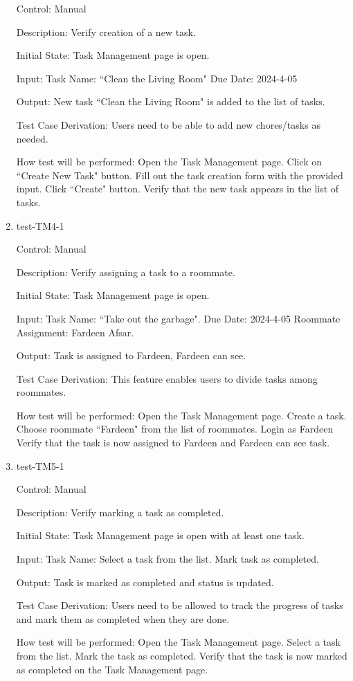 \documentclass[12pt, titlepage]{article}
\begin{document}
\begin{enumerate}
Control: Manual

Description: Verify creation of a new task.
					
Initial State: Task Management page is open.
					
Input: Task Name: ``Clean the Living Room"
Due Date: 2024-4-05
					
Output: New task ``Clean the Living Room" is added to the list of tasks.

Test Case Derivation: Users need to be able to add new chores/tasks as needed.

How test will be performed: 
Open the Task Management page.
Click on ``Create New Task" button.
Fill out the task creation form with the provided input.
Click ``Create" button.
Verify that the new task appears in the list of tasks.


\item{test-TM4-1\\}

Control: Manual

Description: Verify assigning a task to a roommate.
					
Initial State: Task Management page is open.
					
Input: Task Name: ``Take out the garbage".
Due Date: 2024-4-05
Roommate Assignment: Fardeen Afsar.
					
Output: Task is assigned to Fardeen, Fardeen can see.

Test Case Derivation: This feature enables users to divide tasks among roommates.

How test will be performed: 
Open the Task Management page.
Create a task.
Choose roommate ``Fardeen" from the list of roommates.
Login as Fardeen
Verify that the task is now assigned to Fardeen and Fardeen can see task.

\item{test-TM5-1\\}

Control: Manual

Description: Verify marking a task as completed.
					
Initial State: Task Management page is open with at least one task.
					
Input: Task Name: Select a task from the list.
Mark task as completed.
					
Output: Task is marked as completed and status is updated.

Test Case Derivation: Users need to be allowed to track the progress of tasks and mark them as completed when they are done.

How test will be performed: 
Open the Task Management page.
Select a task from the list.
Mark the task as completed.
Verify that the task is now marked as completed on the Task Management page.



\end{enumerate}
\end{document}
